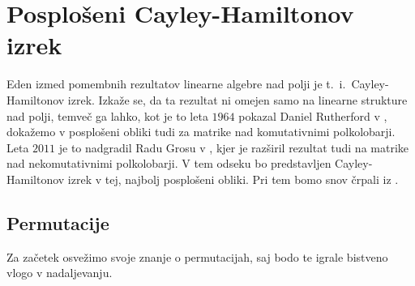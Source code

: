\documentclass[mat1]{fmfdelo}
\begin{document}
\section{Posplošeni Cayley-Hamiltonov izrek}\label{sect:CHT}
Eden izmed pomembnih rezultatov linearne algebre nad polji je t.~i.~Cayley-Hamiltonov izrek. Izkaže se, da ta rezultat ni omejen samo na linearne strukture nad polji, temveč ga lahko, kot je to leta $1964$ pokazal Daniel Rutherford v \cite{bib:Rutherford}, dokažemo v posplošeni obliki tudi za matrike nad komutativnimi polkolobarji. Leta $2011$ je to nadgradil Radu Grosu v \cite{bib:Grosu}, kjer je razširil rezultat tudi na matrike nad nekomutativnimi polkolobarji. V tem odseku bo predstavljen Cayley-Hamiltonov izrek v tej, najbolj posplošeni obliki. Pri tem bomo snov črpali iz \cite{bib:Grosu}.

\subsection{Permutacije}\label{subsect:perm}
Za začetek osvežimo svoje znanje o permutacijah, saj bodo te igrale bistveno vlogo v nadaljevanju.
\end{document}
